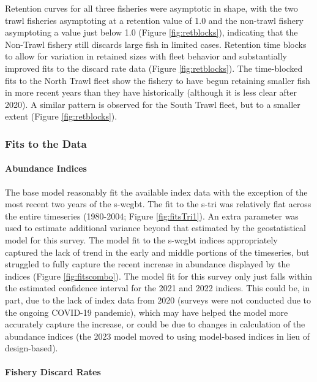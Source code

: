 \documentclass[11pt,
  letterpaper,
]{article}
\begin{document}
Retention curves for all three fisheries were asymptotic in shape, with the two trawl fisheries asymptoting at a retention value of 1.0 and the non-trawl fishery asymptoting a value just below 1.0 (Figure \ref{fig:retblocks}), indicating that the Non-Trawl fishery still discards large fish in limited cases. Retention time blocks to allow for variation in retained sizes with fleet behavior and substantially improved fits to the discard rate data (Figure \ref{fig:retblocks}). The time-blocked fits to the North Trawl fleet show the fishery to have begun retaining smaller fish in more recent years than they have historically (although it is less clear after 2020). A similar pattern is observed for the South Trawl fleet, but to a smaller extent (Figure \ref{fig:retblocks}).

\hypertarget{fits-to-the-data}{%
\subsubsection{Fits to the Data}\label{fits-to-the-data}}

\hypertarget{abundance-indices}{%
\paragraph{Abundance Indices}\label{abundance-indices}}

The base model reasonably fit the available index data with the exception of the most recent two years of the \gls{s-wcgbt}. The fit to the \gls{s-tri} was relatively flat across the entire timeseries (1980-2004; Figure \ref{fig:fitsTri1}). An extra parameter was used to estimate additional variance beyond that estimated by the geostatistical model for this survey. The model fit to the \gls{s-wcgbt} indices appropriately captured the lack of trend in the early and middle portions of the timeseries, but struggled to fully capture the recent increase in abundance displayed by the indices (Figure \ref{fig:fitscombo}). The model fit for this survey only just falls within the estimated confidence interval for the 2021 and 2022 indices. This could be, in part, due to the lack of index data from 2020 (surveys were not conducted due to the ongoing COVID-19 pandemic), which may have helped the model more accurately capture the increase, or could be due to changes in calculation of the abundance indices (the 2023 model moved to using model-based indices in lieu of design-based).

\hypertarget{fishery-discard-rates}{%
\paragraph{Fishery Discard Rates}\label{fishery-discard-rates}}
\end{document}
